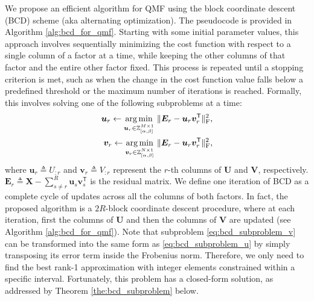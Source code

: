 We propose an efficient algorithm for QMF using the block coordinate descent (BCD) scheme (aka alternating optimization).
The pseudocode is provided in Algorithm \ref{alg:bcd_for_qmf}.
Starting with some initial parameter values, this approach involves sequentially minimizing the cost function with respect to a single column of a factor at a time, while keeping the other columns of that factor and the entire other factor fixed. This process is repeated until a stopping criterion is met, such as when the change in the cost function value falls below a predefined threshold or the maximum number of iterations is reached. Formally, this involves solving one of the following subproblems at a time:
\begin{align}
    \bm{u}_r \gets \underset{\bm{u}_r \in \mathbb{Z}_{[\alpha,\beta]}^{M \times 1}}{\operatorname*{arg\,min}} \ \lVert \bm{E}_r - \bm{u}_r \bm{v}_r^\mathsf{T} \rVert_\text{F}^2, \label{eq:bcd_subproblem_u} \\
    \bm{v}_r \gets \underset{\bm{v}_r \in \mathbb{Z}_{[\alpha,\beta]}^{N \times 1}}{\operatorname*{arg\,min}} \ \lVert \bm{E}_r - \bm{u}_r \bm{v}_r^\mathsf{T} \rVert_\text{F}^2, \label{eq:bcd_subproblem_v}
\end{align}
where $\bm{u}_r \triangleq U_{:r}$ and $\bm{v}_r \triangleq V_{:r}$ represent the $r$-th columns of $\bm{U}$ and $\bm{V}$, respectively. $\bm{E}_r \triangleq \bm{X} - \sum_{s \neq r}^{R} \bm{u}_s \bm{v}_s^\mathsf{T}$ is the residual matrix. We define one iteration of BCD as a complete cycle of updates across all the columns of both factors. In fact, the proposed algorithm is a $2R$-block coordinate descent procedure, where at each iteration, first the columns of $\bm{U}$ and then the columns of $\bm{V}$ are updated (see Algorithm \ref{alg:bcd_for_qmf}). Note that subproblem \eqref{eq:bcd_subproblem_v} can be transformed into the same form as \eqref{eq:bcd_subproblem_u} by simply transposing its error term inside the Frobenius norm. Therefore, we only need to find the best rank-1 approximation with integer elements constrained within a specific interval. Fortunately, this problem has a closed-form solution, as addressed by Theorem \ref{the:bcd_subproblem} below.

